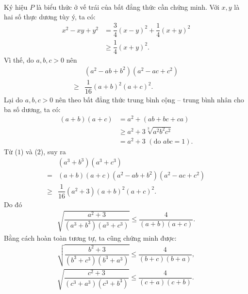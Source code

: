 \begin{multicols}{2}
	\vskip 0.05cm
	Ký hiệu $P$ là biểu thức ở vế trái của bất đẳng thức cần chứng minh.
	\vskip 0.05cm
	Với $x, y$ là hai số thực dương tùy ý, ta có:
	\begin{align*}
		{x^2} - xy + {y^2} &= \dfrac{3}{4}{(x - y)^2} + \dfrac{1}{4}{(x + y)^2}\\ &\ge \dfrac{1}{4}{(x + y)^2}.
	\end{align*}
	Vì thế, do $a, b, c > 0$ nên
	\begin{align*}
		&\left( {{a^2} - ab + {b^2}} \right)\left( {{a^2} - ac + {c^2}} \right)\\ 
		\ge &\dfrac{1}{{16}}{\left( {a + b} \right)^2}{\left( {a + c} \right)^2}. \tag{$1$}
	\end{align*}
	Lại do $a, b, c > 0$ nên theo bất đẳng thức trung bình cộng -- trung bình nhân cho ba số dương, ta có:
	\begin{align*}
		\left( {a \!+\! b} \right)\!\left( {a \!+\! c} \right) &= {a^2} + \left( {ab + bc + ca} \right) \\
		&\ge {a^2} + 3\sqrt[3]{{{a^2}{b^2}{c^2}}} \\
		&= {a^2} \!+\! 3 \,\,({\text{do }}abc = 1). \tag{$2$}
	\end{align*}
	Từ ($1$) và ($2$), suy ra
	\begin{align*}
		&\left( {{a^3} + {b^3}} \right)\left( {{a^3} + {c^3}} \right) \\
		= &\left( {a \!+\! b} \right)\!\left( {a \!+\! c} \right)\left( {{a^2} \!-\! ab \!+\! {b^2}} \right)\!\left( {{a^2} \!-\! ac \!+\! {c^2}} \right) \\
		\ge &\dfrac{1}{{16}}\left( {{a^2} + 3} \right){\left( {a + b} \right)^2}{\left( {a + c} \right)^2}.
	\end{align*}
	Do đó
	\begin{align*}
		\sqrt {\!\!\dfrac{{{a^2} \!+\! 3}}{{\left( {{a^3} \!+\! {b^3}} \right)\!\left( {{a^3} \!+\! {c^3}} \right)}}}  \!\le\! \dfrac{4}{{\left( {a \!+\! b} \right)\!\left( {a \!+\! c} \right)}}. \tag{$3$}
	\end{align*}
	Bằng cách hoàn toàn tương tự, ta cũng chứng minh được:
	\begin{align*}
		\sqrt {\!\!\dfrac{{{b^2} \!+\! 3}}{{\left( {{b^3} \!+\! {c^3}} \right)\!\left( {{b^3} \!+\! {a^3}} \right)}}}  \!\le\! \dfrac{4}{{\left( {b \!+\! c} \right)\!\left( {b \!+\! a} \right)}}, \tag{$4$}\\
		\sqrt {\!\!\dfrac{{{c^2} \!+\! 3}}{{\left( {{c^3} \!+\! {a^3}} \right)\!\left( {{c^3} \!+\! {b^3}} \right)}}}  \!\le\! \dfrac{4}{{\left( {c \!+\! a} \right)\!\left( {c \!+\! b} \right)}}. \tag{$5$}

\end{align*}
\end{multicols}
